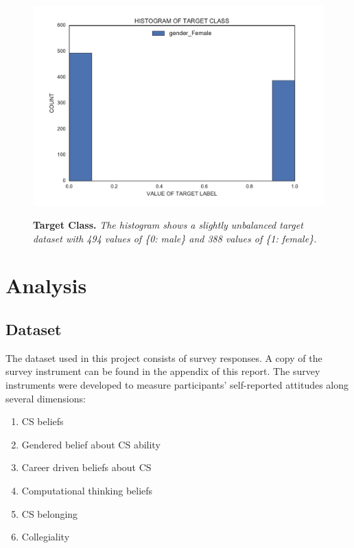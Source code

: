 \begin{figure}[!hbtp]
\centering

    \caption{\textbf{Target Class. }\textit{The histogram shows a slightly unbalanced target dataset with 494 values of \{0: male\} and 388 values of \{1: female\}.}}

    \includegraphics[width=1\textwidth]{figures/targetClass}
    \label{targetClass}
\end{figure}


\chapter*{Analysis}

\section* {Dataset}
The dataset used in this project consists of survey responses. A copy of the survey instrument can be found in the appendix of this report. The survey instruments were developed to measure participants' self-reported attitudes along several dimensions: 

\begin{enumerate}%
\item CS beliefs
\item Gendered belief about CS ability
\item Career driven beliefs about CS
\item Computational thinking beliefs
\item CS belonging
\item Collegiality
\end{enumerate}

